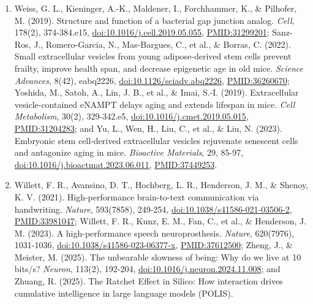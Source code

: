 \documentclass[10pt,letterpaper]{article}
\begin{document}
\begin{enumerate}
  \emph{Philosophical Transactions of the Royal Society B}, 364(1528),
  2405-2415,
  \href{https://doi.org/10.1098/rstb.2009.0052}{doi:10.1098/rstb.2009.0052},
  \url{PMID:19620111}; and von Frisch, K. (1967). \emph{The Dance
  Language and Orientation of Bees}. Harvard University Press.
\item
  Weiss, G. L., Kieninger, A.-K., Maldener, I., Forchhammer, K., \&
  Pilhofer, M. (2019). Structure and function of a bacterial gap
  junction analog. \emph{Cell}, 178(2), 374-384.e15,
  \href{https://doi.org/10.1016/j.cell.2019.05.055}{doi:10.1016/j.cell.2019.05.055},
  \url{PMID:31299201}; Sanz-Ros, J., Romero-Garcia, N., Mas-Bargues, C.,
  et al., \& Borras, C. (2022). Small extracellular vesicles from young
  adipose-derived stem cells prevent frailty, improve health span, and
  decrease epigenetic age in old mice. \emph{Science Advances}, 8(42),
  eabq2226,
  \href{https://doi.org/10.1126/sciadv.abq2226}{doi:10.1126/sciadv.abq2226},
  \url{PMID:36260670}; Yoshida, M., Satoh, A., Lin, J. B., et al., \&
  Imai, S.-I. (2019). Extracellular vesicle-contained eNAMPT delays
  aging and extends lifespan in mice. \emph{Cell Metabolism}, 30(2),
  329-342.e5,
  \href{https://doi.org/10.1016/j.cmet.2019.05.015}{doi:10.1016/j.cmet.2019.05.015},
  \url{PMID:31204283}; and Yu, L., Wen, H., Liu, C., et al., \& Liu, N.
  (2023). Embryonic stem cell-derived extracellular vesicles rejuvenate
  senescent cells and antagonize aging in mice. \emph{Bioactive
  Materials}, 29, 85-97,
  \href{https://doi.org/10.1016/j.bioactmat.2023.06.011}{doi:10.1016/j.bioactmat.2023.06.011},
  \url{PMID:37449253}.
\item
  Willett, F. R., Avansino, D. T., Hochberg, L. R., Henderson, J. M., \&
  Shenoy, K. V. (2021). High-performance brain-to-text communication via
  handwriting. \emph{Nature}, 593(7858), 249-254,
  \href{https://doi.org/10.1038/s41586-021-03506-2}{doi:10.1038/s41586-021-03506-2},
  \url{PMID:33981047}; Willett, F. R., Kunz, E. M., Fan, C., et al., \&
  Henderson, J. M. (2023). A high-performance speech neuroprosthesis.
  \emph{Nature}, 620(7976), 1031-1036,
  \href{https://doi.org/10.1038/s41586-023-06377-x}{doi:10.1038/s41586-023-06377-x},
  \url{PMID:37612500}; Zheng, J., \& Meister, M. (2025). The unbearable
  slowness of being: Why do we live at 10 bits/s? \emph{Neuron}, 113(2),
  192-204,
  \href{https://doi.org/10.1016/j.neuron.2024.11.008}{doi:10.1016/j.neuron.2024.11.008};
  and Zhuang, R. (2025). The Ratchet Effect in Silico: How interaction
  drives cumulative intelligence in large language models (POLIS).

\end{enumerate}
\end{document}
